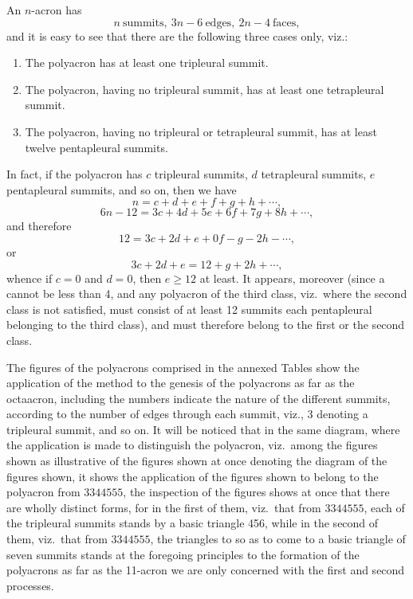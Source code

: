 \documentclass[11pt,a4paper]{article}
\begin{document}
\medskip

An $n$-acron has
\[
n\ \text{summits},\ 3n-6\ \text{edges},\ 2n-4\ \text{faces},
\]
and it is easy to see that there are the following three cases only, viz.:
\begin{enumerate}
\item The polyacron has at least one tripleural summit.
\item The polyacron, having no tripleural summit, has at least one tetrapleural summit.
\item The polyacron, having no tripleural or tetrapleural summit, has at least twelve pentapleural summits.
\end{enumerate}

In fact, if the polyacron has $c$ tripleural summits, $d$ tetrapleural summits, $e$ pentapleural summits, and so on, then we have
\[
n=c+d+e+f+g+h+\cdots,
\]
\[
6n-12=3c+4d+5e+6f+7g+8h+\cdots,
\]
and therefore
\[
12=3c+2d+e+0f-g-2h-\cdots,
\]
or
\[
3c+2d+e=12+g+2h+\cdots,
\]
whence if $c=0$ and $d=0$, then $e\geq 12$ at least. It appears, moreover (since a cannot be less than 4, and any polyacron of the third class, viz.\ where the second class is not satisfied, must consist of at least 12 summits each pentapleural belonging to the third class), and must therefore belong to the first or the second class.

\medskip

The figures of the polyacrons comprised in the annexed Tables show the application of the method to the genesis of the polyacrons as far as the octaacron, including the numbers indicate the nature of the different summits, according to the number of edges through each summit, viz., 3 denoting a tripleural summit, and so on. It will be noticed that in the same diagram, where the application is made to distinguish the polyacron, viz.\ among the figures shown as illustrative of the figures shown at once denoting the diagram of the figures shown, it shows the application of the figures shown to belong to the polyacron from $3344555$, the inspection of the figures shows at once that there are wholly distinct forms, for in the first of them, viz.\ that from $3344555$, each of the tripleural summits stands by a basic triangle 456, while in the second of them, viz.\ that from $3344555$, the triangles to so as to come to a basic triangle of seven summits stands at the foregoing principles to the formation of the polyacrons as far as the 11-acron we are only concerned with the first and second processes.

\medskip
\end{document}
